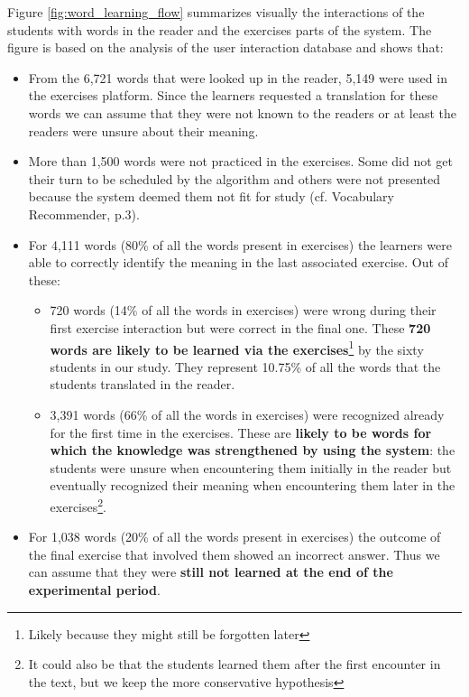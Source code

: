   Figure \ref{fig:word_learning_flow} summarizes visually the interactions of the students with words in the reader and the exercises parts of the system. The figure is based on the analysis of the user interaction database and shows that: 

  \begin{itemize}
    \item From the 6,721 words that were looked up in the reader, 5,149 were used in the exercises platform. Since the learners requested a translation for these words we can assume that they were not known to the readers or at least the readers were unsure about their meaning. 

    \item More than 1,500 words were not practiced in the exercises. 
    Some did not get their turn to be scheduled by the algorithm and others were not presented because the system deemed them not fit for study (cf. Vocabulary Recommender, p.3). 

    \item For 4,111 words (80\% of all the words present in exercises) the learners were able to correctly identify the meaning in the last associated exercise. Out of these: 

    \begin{itemize}
      \item 720 words (14\% of all the words in exercises) were wrong during their first exercise interaction but were correct in the final one. These {\bf 720 words are likely to be learned via the exercises}\footnote{Likely because they might still be forgotten later} by the sixty students in our study. They represent 10.75\% of all the words that the students translated in the reader.

      \item 3,391 words (66\% of all the words in exercises) were recognized already for the first time in the exercises. These are {\bf likely to be words for which the knowledge was strengthened by using the system}: the students were unsure when encountering them initially in the reader but eventually recognized their meaning when encountering them later in the exercises\footnote{It could also be that the students learned them after the first encounter in the text, but we keep the more conservative hypothesis}. 
    \end{itemize}

  \item For 1,038 words (20\% of all the words present in exercises) the outcome of the final exercise that involved them showed an incorrect answer. Thus we can assume that they were {\bf still not learned at the end of the experimental period}.

  \end{itemize}


